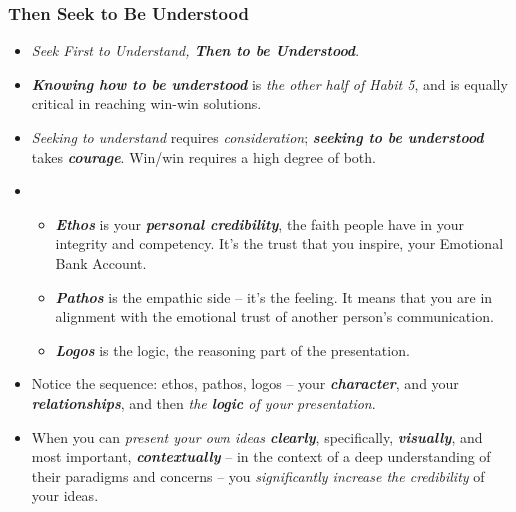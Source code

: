 \documentclass[11pt]{article}
\begin{document}
\subsubsection{Then Seek to Be Understood}
\begin{itemize}
\item \emph{Seek First to Understand, \textbf{Then to be Understood}}. 

\item \emph{\textbf{Knowing how to be understood}} is \emph{the other half of Habit 5}, and is equally critical in reaching win-win solutions.

\item \emph{Seeking to understand} requires \emph{consideration}; \emph{\textbf{seeking to be understood}} takes \emph{\textbf{courage}}. Win/win requires a high
degree of both.

\item \begin{itemize}
\item \emph{\textbf{Ethos}} is your \emph{\textbf{personal credibility}}, the faith people have in your integrity and competency. It's the
trust that you inspire, your Emotional Bank Account.
\item \emph{\textbf{Pathos}} is the empathic side -- it's the feeling. It means that you are in alignment with the emotional trust of another person's communication. 
\item \emph{\textbf{Logos}} is the logic, the reasoning part of the presentation.
\end{itemize}

\item Notice the sequence: ethos, pathos, logos -- your \emph{\textbf{character}}, and your \emph{\textbf{relationships}}, and then \emph{the \textbf{logic} of your presentation}.

\item When you can \emph{present your own ideas \textbf{clearly}}, specifically, \emph{\textbf{visually}}, and most important, \emph{\textbf{contextually}} -- in the context of a deep understanding of their paradigms and concerns -- you \emph{significantly increase the credibility} of your ideas.

\end{itemize}
\end{document}
